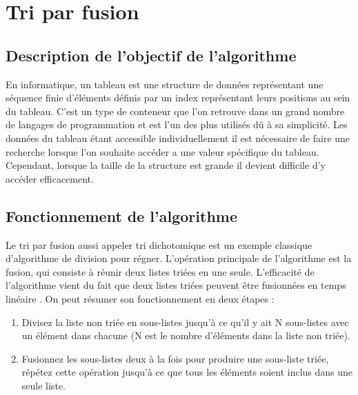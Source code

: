 \chapter{Tri par fusion}
\section{Description de l’objectif de l’algorithme}
En informatique, un tableau est une structure de données représentant une séquence finie d’éléments définis par un index représentant leurs positions au sein du tableau. 
C’est un type de conteneur que l’on retrouve dans un grand nombre de langages de programmation et est l’un des plus utilisés dû à sa simplicité. Les données du tableau étant accessible individuellement il est nécessaire de faire une recherche lorsque l’on souhaite accéder a une valeur spécifique du tableau. Cependant, lorsque la taille de la structure est grande il devient difficile d’y accéder efficacement.
\section{Fonctionnement de l'algorithme}
Le tri par fusion aussi appeler tri dichotomique est un exemple classique d’algorithme de division pour régner. 
L’opération principale de l’algorithme est la fusion, qui consiste à réunir deux listes triées en une seule. L’efficacité de l’algorithme vient du fait que deux listes triées peuvent être fusionnées en temps linéaire . On peut résumer son fonctionnement en deux étapes :
\par
\begin{enumerate}
  \item Divisez la liste non triée en sous-listes jusqu'à ce qu'il y ait N sous-listes avec un élément dans chacune (N est le nombre d'éléments dans la liste non triée).
  \item Fusionnez les sous-listes deux à la fois pour produire une sous-liste triée, répétez cette opération jusqu'à ce que tous les éléments soient inclus dans une seule liste.
\end{enumerate}

